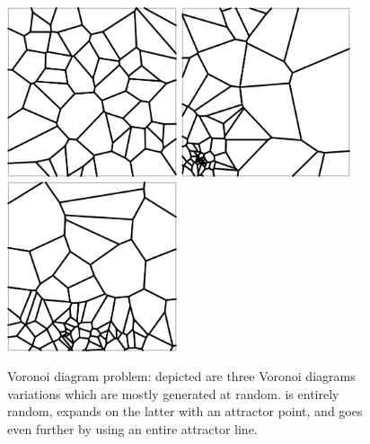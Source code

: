 \begin{figure}[htb]
    {\includegraphics[height=5cm]{fig/voronoi-problem-rand}}
  \hfill
    {\includegraphics[height=5cm]{fig/voronoi-problem-1attr}}
  \hfill
    {\includegraphics[height=5cm]{fig/voronoi-problem-edge}}
  \caption[Voronoi diagram problem]{
    Voronoi diagram problem: depicted are three Voronoi diagrams variations
    which are mostly generated at random.
     is entirely random,
     expands on the latter with an
    attractor point, and  goes even
    further by using an entire attractor line.}%
  \label{fig:eval.studies.voronoi.prob}
\end{figure}


